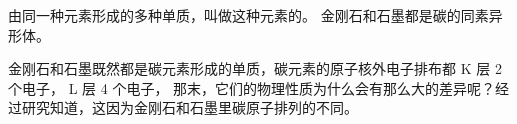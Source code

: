 由同一种元素形成的多种单质，叫做这种元素的。
金刚石和石墨都是碳的同素异形体。

金刚石和石墨既然都是碳元素形成的单质，碳元素的原子核外电子排布都 K 层 2 个电子， L 层 4 个电子，
那末，它们的物理性质为什么会有那么大的差异呢？经过研究知道，这因为金刚石和石墨里碳原子排列的不同。


\begin{xiti}


\begin{xiaoxiaotis}





\end{xiaoxiaotis}



\end{xiti}

